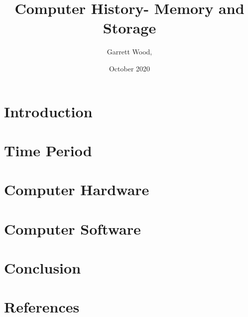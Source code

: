 \documentclass{article}
\title{Computer History- Memory and Storage}
\author{Garrett Wood, }
\date{October 2020}
\begin{document}
\maketitle

\section{Introduction}

\section{Time Period}

\section{Computer Hardware}

\section{Computer Software}

\section{Conclusion}

\section{References}
\end{document}
